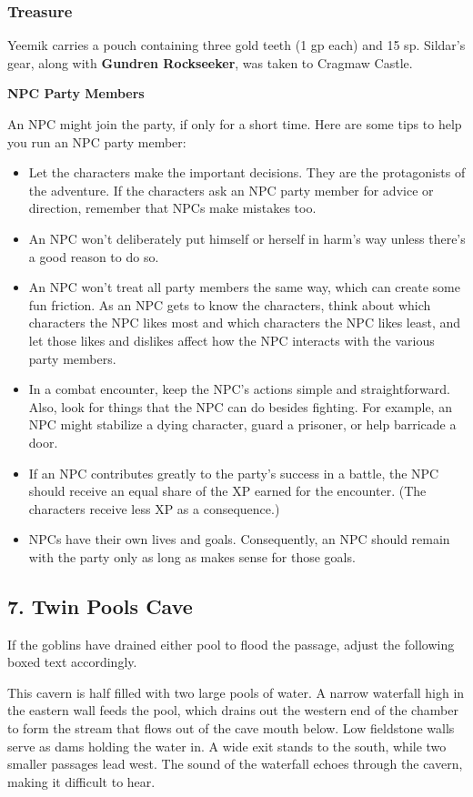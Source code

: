 \documentclass[10pt,a4paper,twoside,bg=print,twocolumn,openany,nodeprecatedcode]{dndbook}
\begin{document}
\subsubsection{Treasure}
Yeemik carries a pouch containing three gold teeth (1 gp each) and 15 sp. Sildar's gear, along with \textbf{Gundren Rockseeker}, was taken to Cragmaw Castle.

\textbf{NPC Party Members}

An NPC might join the party, if only for a short time. Here are some tips to help you run an NPC party member:


\begin{itemize}
\item Let the characters make the important decisions. They are the protagonists of the adventure. If the characters ask an NPC party member for advice or direction, remember that NPCs make mistakes too.
\item An NPC won't deliberately put himself or herself in harm's way unless there's a good reason to do so.
\item An NPC won't treat all party members the same way, which can create some fun friction. As an NPC gets to know the characters, think about which characters the NPC likes most and which characters the NPC likes least, and let those likes and dislikes affect how the NPC interacts with the various party members.
\item In a combat encounter, keep the NPC's actions simple and straightforward. Also, look for things that the NPC can do besides fighting. For example, an NPC might stabilize a dying character, guard a prisoner, or help barricade a door.
\item If an NPC contributes greatly to the party's success in a battle, the NPC should receive an equal share of the XP earned for the encounter. (The characters receive less XP as a consequence.)
\item NPCs have their own lives and goals. Consequently, an NPC should remain with the party only as long as makes sense for those goals.
\end{itemize}

\subsection{7. Twin Pools Cave}
If the goblins have drained either pool to flood the passage, adjust the following boxed text accordingly.

\begin{DndReadAloud}{}
This cavern is half filled with two large pools of water. A narrow waterfall high in the eastern wall feeds the pool, which drains out the western end of the chamber to form the stream that flows out of the cave mouth below. Low fieldstone walls serve as dams holding the water in. A wide exit stands to the south, while two smaller passages lead west. The sound of the waterfall echoes through the cavern, making it difficult to hear.

\end{DndReadAloud}
\end{document}
